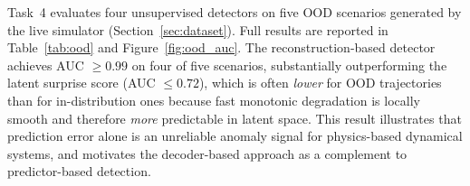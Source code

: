 Task~4 evaluates four unsupervised detectors on five OOD scenarios generated
by the live simulator (Section~\ref{sec:dataset}).
Full results are reported in Table~\ref{tab:ood} and Figure~\ref{fig:ood_auc}.
The reconstruction-based detector achieves AUC ${\geq}0.99$ on four of five
scenarios, substantially outperforming the latent surprise score (AUC ${\leq}0.72$),
which is often \emph{lower} for OOD trajectories than for in-distribution ones
because fast monotonic degradation is locally smooth and therefore
\emph{more} predictable in latent space.  This result illustrates that
prediction error alone is an unreliable anomaly signal for physics-based
dynamical systems, and motivates the decoder-based approach as a complement
to predictor-based detection.

